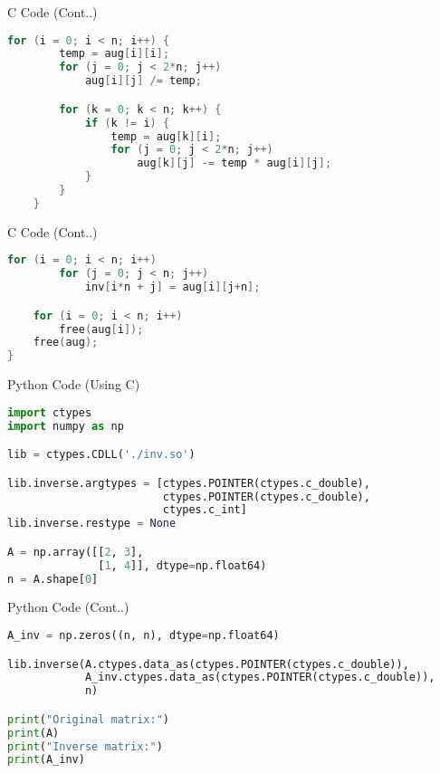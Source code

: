 \documentclass{beamer}
\begin{document}
\begin{frame}[fragile]{C Code (Cont..)}
\begin{lstlisting}[language=C]
    for (i = 0; i < n; i++) {
        temp = aug[i][i];
        for (j = 0; j < 2*n; j++)
            aug[i][j] /= temp;

        for (k = 0; k < n; k++) {
            if (k != i) {
                temp = aug[k][i];
                for (j = 0; j < 2*n; j++)
                    aug[k][j] -= temp * aug[i][j];
            }
        }
    }
\end{lstlisting}
\end{frame}

\begin{frame}[fragile]{C Code (Cont..)}
\begin{lstlisting}[language=C]
    for (i = 0; i < n; i++)
        for (j = 0; j < n; j++)
            inv[i*n + j] = aug[i][j+n];

    for (i = 0; i < n; i++)
        free(aug[i]);
    free(aug);
}
\end{lstlisting}
\end{frame}

\begin{frame}[fragile]{Python Code (Using C)}
\begin{lstlisting}[language=Python]
import ctypes
import numpy as np

lib = ctypes.CDLL('./inv.so')

lib.inverse.argtypes = [ctypes.POINTER(ctypes.c_double),
                        ctypes.POINTER(ctypes.c_double),
                        ctypes.c_int]
lib.inverse.restype = None

A = np.array([[2, 3],
              [1, 4]], dtype=np.float64)
n = A.shape[0]
\end{lstlisting}
\end{frame}

\begin{frame}[fragile]{Python Code (Cont..)}
\begin{lstlisting}[language=Python]
A_inv = np.zeros((n, n), dtype=np.float64)

lib.inverse(A.ctypes.data_as(ctypes.POINTER(ctypes.c_double)),
            A_inv.ctypes.data_as(ctypes.POINTER(ctypes.c_double)),
            n)

print("Original matrix:")
print(A)
print("Inverse matrix:")
print(A_inv)
\end{lstlisting}
\end{frame}
\end{document}
